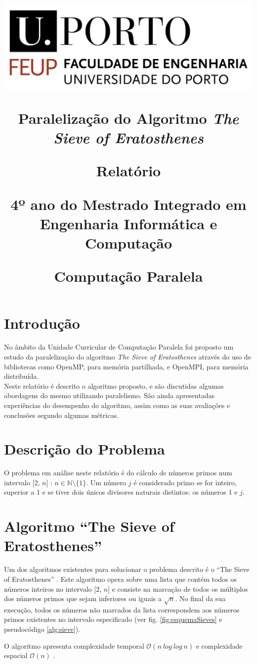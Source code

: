 \documentclass[a4paper]{article}
\title {

\includegraphics[scale=0.5]{feup-logo.png}\linebreak\linebreak\linebreak

\Huge\textbf{Paralelização do Algoritmo \textit{The Sieve of Eratosthenes}}\linebreak

\Large\textbf{Relatório}\linebreak

\Large{4º ano do Mestrado Integrado em Engenharia Informática e Computação}\linebreak\linebreak

\Large\textbf{Computação Paralela}\linebreak
}
\begin{document}
\section{Introdução}
 
No âmbito da Unidade Curricular de Computação Paralela foi proposto um estudo da paralelização do algoritmo \textit{The Sieve of Eratosthenes} através do uso de bibliotecas como OpenMP, para memória partilhada, e OpenMPI, para memória distribuída.\\
Neste relatório é descrito o algoritmo proposto, e são discutidas algumas abordagens do mesmo utilizando paralelismo. São ainda apresentadas experiências do desempenho do algoritmo, assim como as suas avaliações e conclusões segundo algumas métricas.
 
\section{Descrição do Problema}
 
O problema em análise neste relatório é do cálculo de números primos num intervalo [2, $n$] : $n \in \mathbb{N} \setminus \{1\}$.
Um número $j$ é considerado primo se for inteiro, superior a 1 e se tiver dois únicos divisores naturais distintos: os números 1 e $j$.
 
\section{Algoritmo ``The Sieve of Eratosthenes''}
 
Um dos algoritmos existentes para solucionar o problema descrito é o ``The Sieve of Eratosthenes'' \cite{michael2003parallel}.
Este algoritmo opera sobre uma lista que contém todos os números inteiros no intervalo [2, $n$] e consiste na marcação de todos os múltiplos dos números primos que sejam inferiores ou iguais a $\sqrt{n}$.
No final da sua execução, todos os números não marcados da lista correspondem aos números primos existentes no intervalo especificado (ver fig. \ref{fig:esquemaSieves} e pseudocódigo \ref{alg:sieve}).
 
O algoritmo apresenta complexidade temporal $\mathcal{O}(n\ log\ log\ n)$ e complexidade espacial $\mathcal{O}(n)$ \cite{sieveGlossary}.
 
 
\end{document}
